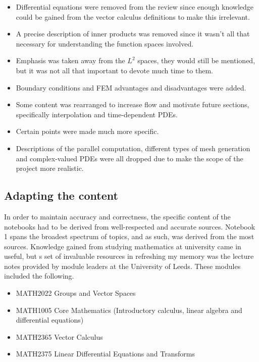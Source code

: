 \begin{itemize}
    \item Differential equations were removed from the review since enough knowledge could be gained from the vector calculus definitions to make this irrelevant.
    \item A precise description of inner products was removed since it wasn't all that necessary for understanding the function spaces involved.
    \item Emphasis was taken away from the $L^2$ spaces, they would still be mentioned, but it was not all that important to devote much time to them.
    \item Boundary conditions and FEM advantages and disadvantages were added.
    \item Some content was rearranged to increase flow and motivate future sections, specifically interpolation and time-dependent PDEs.
    \item Certain points were made much more specific.
    \item Descriptions of the parallel computation, different types of mesh generation and complex-valued PDEs were all dropped due to make the scope of the project more realistic.
\end{itemize}

\subsection{Adapting the content}

In order to maintain accuracy and correctness, the specific content of the notebooks had to be derived from well-respected and accurate sources. Notebook 1 spans the broadest spectrum of topics, and as such, was derived from the most sources. Knowledge gained from studying mathematics at university came in useful, but s set of invaluable resources in refreshing my memory was the lecture notes provided by module leaders at the University of Leeds. These modules included the following.

\begin{itemize}
    \item MATH2022 Groups and Vector Spaces
    \item MATH1005 Core Mathematics (Introductory calculus, linear algebra and differential equations)
    \item MATH2365 Vector Calculus
    \item MATH2375 Linear Differential Equations and Transforms
\end{itemize}

